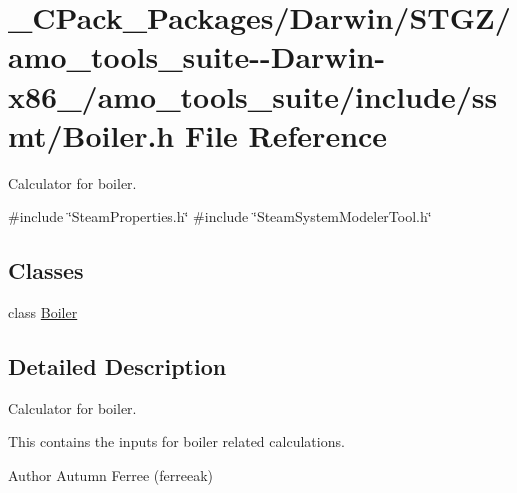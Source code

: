 \hypertarget{___c_pack___packages_2_darwin_2_s_t_g_z_2amo__tools__suite--_darwin-x86__64_2amo__tools__suite_2include_2ssmt_2_boiler_8h}{}\section{\+\_\+\+C\+Pack\+\_\+\+Packages/\+Darwin/\+S\+T\+G\+Z/amo\+\_\+tools\+\_\+suite-\/-\/\+Darwin-\/x86\+\_/amo\+\_\+tools\+\_\+suite/include/ssmt/\+Boiler.h File Reference}
\label{___c_pack___packages_2_darwin_2_s_t_g_z_2amo__tools__suite--_darwin-x86__64_2amo__tools__suite_2include_2ssmt_2_boiler_8h}


Calculator for boiler.  


{\ttfamily \#include \char`\"{}Steam\+Properties.\+h\char`\"{}}\newline
{\ttfamily \#include \char`\"{}Steam\+System\+Modeler\+Tool.\+h\char`\"{}}\newline
\subsection*{Classes}
\begin{DoxyCompactItemize}
\item 
class \hyperlink{class_boiler}{Boiler}
\end{DoxyCompactItemize}


\subsection{Detailed Description}
Calculator for boiler. 

This contains the inputs for boiler related calculations.

\begin{DoxyAuthor}{Author}
Autumn Ferree (ferreeak) 
\end{DoxyAuthor}
